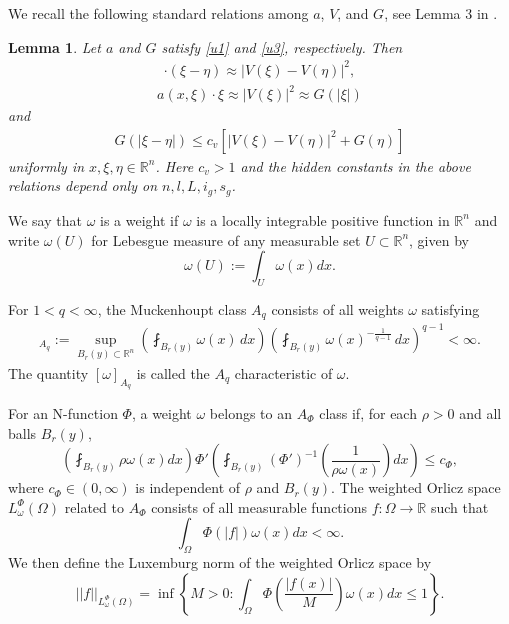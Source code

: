 \documentclass[10pt,a4paper]{article}
\newtheorem{lemma}[theorem]{Lemma}
\theoremstyle{definition}
\numberwithin{equation}{section}
\newcommand{\R}{\mathbb{R}}
\newcommand{\ls}{\leqslant}
\begin{document}
We recall the following standard relations among $a$, $V$, and $G$, see Lemma 3 in \cite{de1}.
\begin{lemma}\label{vg}
Let $a$ and $G$ satisfy \eqref{u1} and \eqref{u3}, respectively. Then
\begin{align*}
	[a(x, \xi) - a(x, \eta)] \cdot (\xi - \eta)  \approx |V(\xi) - V(\eta)|^2, 
	\end{align*}
	\begin{align*}
		a(x, \xi) \cdot \xi \approx |V(\xi)|^2 \approx G(|\xi|)
	\end{align*}
 and
 \begin{align}\label{cv}
G(|\xi-\eta|)\leqslant c_v \left[ |V(\xi) - V(\eta)|^2+G(\eta)\right] 
	\end{align}
uniformly in $x, \xi, \eta \in \mathbb{R}^n$. 
 Here $c_v>1$ and the hidden constants in the above relations depend only on $n,l,L,i_g,s_g$.
\end{lemma}


 

\begin{df}
We say that $\omega$ is a weight if $\omega$ is a locally integrable positive function in $\R^n$ and write $\omega(U)$ for Lebesgue measure of any measurable set $U \subset \R^n$, given by
$$\omega(U):=\int_{U}\omega(x)dx.$$
\end{df}

\begin{df}
For $1<q<\infty$, the Muckenhoupt class $A_q$ consists of all
weights $\omega$ satisfying
\begin{align}
	[\omega]_{A_q}
	:=
	\sup_{B_r(y)\subset\mathbb{R}^n}
	\left(\fint_{B_r(y)}\omega(x)\,dx\right)
	\left(
	\fint_{B_r(y)}
	\omega(x)^{-\frac{1}{q-1}}\,dx
	\right)^{q-1}
	<\infty.
\end{align}
The quantity $[\omega]_{A_q}$ is called the $A_q$ characteristic
of $\omega$.

For an N-function $\Phi$, a weight $\omega$ belongs to an $A_{\Phi}$ class if, for each $\rho>0$ and all balls $B_r(y)$,
$$\left( \fint_{B_r(y)}\rho \omega(x)dx \right) \Phi'\left( \fint_{B_r(y)}(\Phi')^{-1}\left( \frac{1}{\rho\omega(x)}\right)dx \right) \ls c_{\Phi},$$
where $c_{\Phi} \in (0,\infty)$ is independent of $\rho$ and $B_r(y)$. The weighted Orlicz space $L^{\Phi}_{\omega}(\Omega)$ related to $A_{\Phi}$ consists of all measurable functions $f: \Omega \rightarrow \R$ such that
$$\int_{\Omega} \Phi(|f|)\omega(x)dx<\infty.$$
We then define the Luxemburg norm of the weighted Orlicz space by
$$||f||_{L^{\Phi}_{\omega}(\Omega)}=\inf \left\lbrace M>0: \int_{\Omega}\Phi \left( \frac{|f(x)|}{M}\right)\omega(x)dx \ls 1 \right\rbrace. $$
\end{df}
\end{document}
